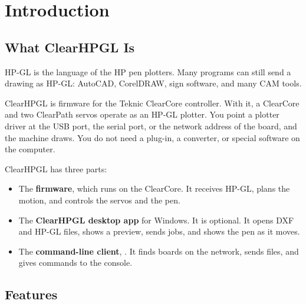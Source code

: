 \chapter{Introduction}\label{ch:intro}

\section{What ClearHPGL Is}

HP-GL is the language of the HP pen plotters. Many programs can still send a
drawing as HP-GL: AutoCAD, CorelDRAW, sign software, and many CAM tools.

ClearHPGL is firmware for the Teknic ClearCore controller. With it, a
ClearCore and two ClearPath servos operate as an HP-GL plotter. You point a
plotter driver at the USB port, the serial port, or the network address of
the board, and the machine draws. You do not need a plug-in, a converter, or
special software on the computer.

ClearHPGL has three parts:

\begin{itemize}
  \item The \textbf{firmware}, which runs on the ClearCore. It receives HP-GL,
        plans the motion, and controls the servos and the pen.
  \item The \textbf{ClearHPGL desktop app} for Windows. It is optional. It
        opens DXF and HP-GL files, shows a preview, sends jobs, and shows the
        pen as it moves.
  \item The \textbf{command-line client}, .
        It finds boards on the network, sends files, and gives commands to
        the console.
\end{itemize}

\section{Features}

